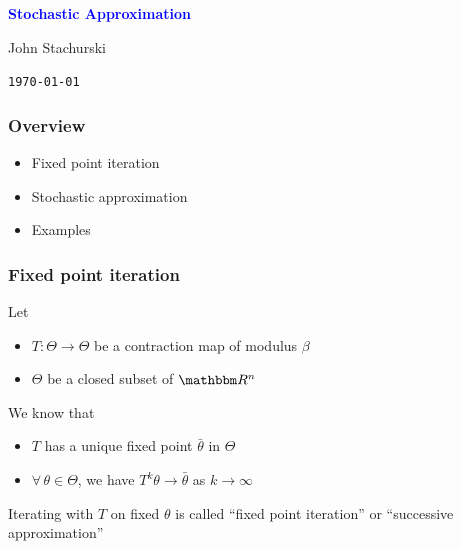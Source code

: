 \documentclass[xcolor=dvipsnames]{beamer}  %
\newcommand{\navy}[1]{\textcolor{blue}{\bf #1}}
\newcommand{\1}{\mathbbm 1}
\newcommand{\RR}{\mathbbm R}
\begin{document}


\begin{frame}
    
    \begin{center}
        \navy{\Large{Stochastic Approximation}}

        
        \vspace{2em}
        John Stachurski 

        \vspace{1em}
        \vspace{1em}
        \texttt{\today}

    \end{center}

\end{frame}

\begin{frame}
    \frametitle{Overview}
    
    \begin{itemize}
        \item Fixed point iteration
            \vspace{0.5em}
        \item Stochastic approximation
            \vspace{0.5em}
        \item Examples
    \end{itemize}

\end{frame}


\begin{frame}
    \frametitle{Fixed point iteration}

    Let 
    \begin{itemize}
        \item $T \colon \Theta \to \Theta$ be a contraction map of modulus $\beta$
            \vspace{1em}
        \item $\Theta$ be a closed subset of $\RR^n$
    \end{itemize}

    \vspace{0.5em}
    \vspace{0.5em}
    We know that 

    \begin{itemize}
        \item $T$ has a unique fixed point $\bar \theta$ in $\Theta$
            \vspace{1em}
        \item $\forall \, \theta \in \Theta$, we have $T^k \theta \to \bar \theta$ as $k \to \infty$ 
    \end{itemize}

    \vspace{0.5em}
    \vspace{0.5em}
    Iterating with $T$ on fixed $\theta$ is called
        ``fixed point iteration'' or
        ``successive approximation''

\end{frame}
\end{document}
